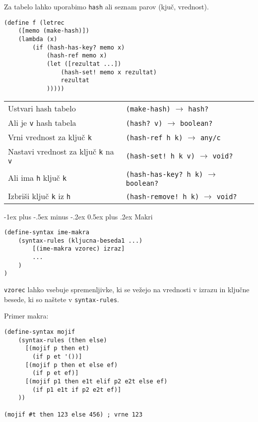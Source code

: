 \documentclass[a3paper,9pt]{extarticle}
\makeatletter
\renewcommand{\section}{\@startsection{section}{1}{0mm}%
                                {-1ex plus -.5ex minus -.2ex}%
                                {0.5ex plus .2ex}%
                                {\normalfont\large\bfseries}}
\makeatother
\begin{document}
\begin{multicols}{4}
Za tabelo lahko uporabimo \lstinline|hash| ali seznam parov (kjuč, vrednost).

\begin{lstlisting}
(define f (letrec 
    ([memo (make-hash)])
    (lambda (x) 
        (if (hash-has-key? memo x) 
            (hash-ref memo x) 
            (let ([rezultat ...])
                (hash-set! memo x rezultat)
                rezultat
            )))))
\end{lstlisting}

\begin{tabular}{@{}p{3.2cm}l@{}}
    Ustvari hash tabelo & \lstinline|(make-hash)| $\rightarrow$ \lstinline|hash?|\\
    Ali je \lstinline|v| hash tabela & \lstinline|(hash? v)| $\rightarrow$ \lstinline|boolean?|\\
    Vrni vrednost za ključ \lstinline|k| & \lstinline|(hash-ref h k)| $\rightarrow$ \lstinline|any/c|\\
    Nastavi vrednost za ključ \lstinline|k| na \lstinline|v| & \lstinline|(hash-set! h k v)| $\rightarrow$ \lstinline|void?|\\
    Ali ima \lstinline|h| ključ \lstinline|k| & \lstinline|(hash-has-key? h k)| $\rightarrow$ \lstinline|boolean?|\\
    Izbriši ključ \lstinline|k| iz \lstinline|h| & \lstinline|(hash-remove! h k)| $\rightarrow$ \lstinline|void?|\\
\end{tabular}

\section{Makri}
\begin{lstlisting}
(define-syntax ime-makra
    (syntax-rules (kljucna-beseda1 ...) 
        [(ime-makra vzorec) izraz]
        ...
    )
)
\end{lstlisting}

\lstinline|vzorec| lahko vsebuje spremenljivke, ki se vežejo na vrednosti v izrazu in ključne besede, ki so naštete v \lstinline|syntax-rules|.

Primer makra:
\begin{lstlisting}
(define-syntax mojif
    (syntax-rules (then else)
      [(mojif p then et) 
        (if p et '())]
      [(mojif p then et else ef)
        (if p et ef)]
      [(mojif p1 then e1t elif p2 e2t else ef)
        (if p1 e1t if p2 e2t ef)]
    ))

(mojif #t then 123 else 456) ; vrne 123
\end{lstlisting}


\end{multicols}
\end{document}
